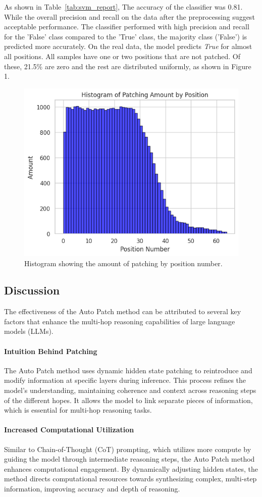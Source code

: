 \documentclass[11pt]{article}
\begin{document}
As shown in Table~\ref{tab:svm_report}, The accuracy of the classifier was 0.81. While the overall precision and recall on the data after the preprocessing suggest acceptable performance. The classifier performed with high precision and recall for the 'False' class compared to the 'True' class, the majority class ('False') is predicted more accurately. On the real data, the model predicts \textit{True} for almost all positions. All samples have one or two positions that are not patched. Of these, 21.5\% are zero and the rest are distributed uniformly, as shown in Figure 1.
\begin{figure}
    \centering
    \includegraphics[width=0.5\linewidth]{position_histogram.png}
    \caption{Histogram showing the amount of patching by position number.}
    \label{fig:enter-label}
\end{figure}

\subsection{Discussion}
The effectiveness of the Auto Patch method can be attributed to several key factors that enhance the multi-hop reasoning capabilities of large language models (LLMs).

\paragraph{Intuition Behind Patching} The Auto Patch method uses dynamic hidden state patching to reintroduce and modify information at specific layers during inference. This process refines the model’s understanding, maintaining coherence and context across reasoning steps of the different hopes. It allows the model to link separate pieces of information, which is essential for multi-hop reasoning tasks.

\paragraph{Increased Computational Utilization} Similar to Chain-of-Thought (CoT) prompting, which utilizes more compute by guiding the model through intermediate reasoning steps, the Auto Patch method enhances computational engagement. By dynamically adjusting hidden states, the method directs computational resources towards synthesizing complex, multi-step information, improving accuracy and depth of reasoning.
\end{document}
